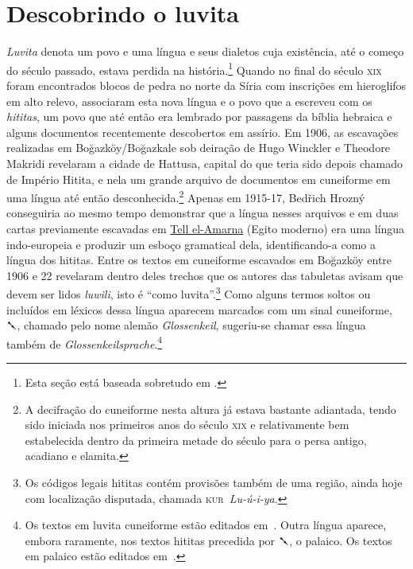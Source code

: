 
\section{Descobrindo o luvita}

\emph{Luvita} denota um povo e uma língua e seus dialetos cuja existência,
até o começo do século passado, estava perdida na história.\footnote{Esta seção
	está baseada sobretudo em \textcite{CHLI11,Melchert2003,Hoffner2008}.}
Quando no final do século \textsc{xix} foram encontrados blocos de pedra no
norte da Síria com inscrições em hieroglifos em alto relevo, associaram esta
nova língua e o povo que a escreveu com os \emph{hititas}, um povo que até
então era lembrado por passagens da bíblia hebraica e alguns documentos
recentemente descobertos em assírio.
Em 1906, as escavações realizadas em Boğazköy\slash{}Boğazkale sob deiração de
Hugo Winckler e Theodore Makridi revelaram a cidade de Hattusa,
capital do que teria sido depois chamado de Império Hitita, e nela um grande
arquivo de documentos em cuneiforme em uma língua até então
desconhecida.\footnote{A decifração do cuneiforme nesta altura já estava
	bastante adiantada, tendo sido iniciada nos primeiros anos do século
	\textsc{xix} e relativamente bem estabelecida dentro da primeira metade do
	século para o persa antigo, acadiano e elamita.}
Apenas em 1915-17, Bedřich Hrozný conseguiria ao mesmo tempo demonstrar que a
língua nesses arquivos e em duas cartas previamente escavadas em
\href{https://pleiades.stoa.org/places/149576487}{Tell el-Amarna}
(Egito moderno) era uma língua indo-europeia e produzir um esboço gramatical
dela, identificando-a como a língua dos hititas.
Entre os textos em cuneiforme escavados em Boğazköy entre 1906 e 22 revelaram
dentro deles trechos que os autores das tabuletas avisam que devem ser lidos
\emph{luwili}, isto é ``como luvita''.\footnote{Os códigos legais hititas
	contém provisões também de uma região, ainda hoje
com localização disputada, chamada \mbox{\textsc{kur} \textit{Lu-ú-i-ya}}.}
Como alguns termos soltos ou incluídos em léxicos dessa língua
aparecem marcados com um sinal cuneiforme, \foreignlanguage{hittite}{𒃵}, chamado
pelo nome alemão \emph{Glossenkeil}, sugeriu-se chamar essa língua também de
\emph{Glossenkeilsprache}.\footnote{Os textos em luvita cuneiforme estão
	editados em~\textcites{Starke1985}{YakubovichMouton2023}.
	Outra língua aparece, embora raramente, 
	nos textos hititas precedida por \foreignlanguage{hittite}{𒃵}, o palaico. Os
textos em palaico estão editados em~\textcite{Carruba1970}.}

